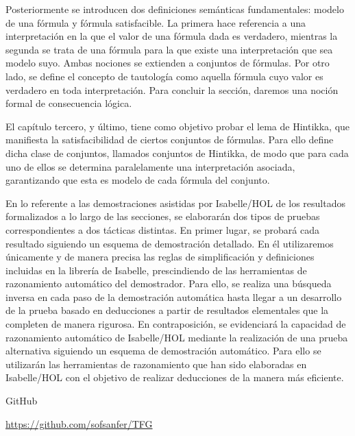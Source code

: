 \begin{isabellebody}
\begin{isamarkuptext}
  Posteriormente se introducen dos definiciones semánticas 
  fundamentales: modelo de una fórmula y fórmula satisfacible. 
  La primera hace referencia a una interpretación en la que el valor 
  de una fórmula dada es verdadero, mientras la segunda se trata de una
  fórmula para la que existe una interpretación que sea modelo suyo. 
  Ambas nociones se extienden a conjuntos de fórmulas. 
  Por otro lado, se define el concepto de tautología como aquella 
  fórmula cuyo valor es verdadero en toda interpretación. Para concluir 
  la sección, daremos una noción formal de consecuencia lógica. 

  El capítulo tercero, y último, tiene como objetivo probar el lema de
  Hintikka, que manifiesta la satisfacibilidad de ciertos conjuntos de
  fórmulas. Para ello define dicha clase de conjuntos, llamados 
  conjuntos de Hintikka, de modo que para cada uno de ellos se 
  determina paralelamente una interpretación asociada, garantizando que 
  esta es modelo de cada fórmula del conjunto.

  En lo referente a las demostraciones asistidas por Isabelle/HOL de
  los resultados formalizados a lo largo de las secciones, se elaborarán 
  dos tipos de pruebas correspondientes a dos tácticas distintas. En 
  primer lugar, se probará cada resultado siguiendo un esquema de 
  demostración detallado. En él utilizaremos únicamente y de manera 
  precisa las reglas de simplificación y definiciones incluidas en la 
  librería de Isabelle, prescindiendo de las herramientas de 
  razonamiento automático del demostrador. Para ello, se realiza una 
  búsqueda inversa en cada paso de la demostración automática hasta 
  llegar a un desarrollo de la prueba basado en deducciones a partir de
  resultados elementales que la completen de manera rigurosa. En 
  contraposición, se evidenciará la capacidad de razonamiento 
  automático de Isabelle/HOL mediante la realización de una prueba 
  alternativa siguiendo un esquema de demostración automático. Para 
  ello se utilizarán las herramientas de razonamiento que han sido 
  elaboradas en Isabelle/HOL con el objetivo de realizar deducciones de 
  la manera más eficiente.

   GitHub  

\href{https://github.com/sofsanfer/TFG}
                  {\url{https://github.com/sofsanfer/TFG}}%
\end{isamarkuptext}\isamarkuptrue%
%
\isadelimtheory
%
\endisadelimtheory
%
\isatagtheory
%
\endisatagtheory
{\isafoldtheory}%
%
\isadelimtheory
%
\endisadelimtheory
%
\end{isabellebody}%
